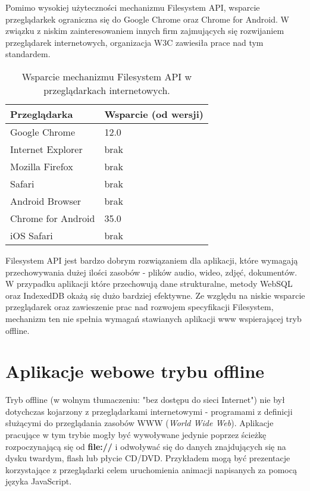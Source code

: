Pomimo wysokiej użyteczności mechanizmu Filesystem API, wsparcie przeglądarkek ograniczna się do Google Chrome oraz Chrome for Android. W związku z niskim zainteresowaniem innych firm zajmujących się rozwijaniem przeglądarek internetowych, organizacja W3C zawiesiła prace nad tym standardem.

\begin{table}[h]
\centering
    \begin{tabular}{ | p{8cm} | p{6cm} | }
    \hline
    \textbf{Przeglądarka} & \textbf{Wsparcie (od wersji)} \\ \hline
	Google Chrome & 12.0
	\\ \hline
	Internet Explorer & brak
	\\ \hline
	Mozilla Firefox & brak
	\\ \hline
	Safari & brak
	\\ \hline
	Android Browser & brak
	\\ \hline
	Chrome for Android & 35.0
	\\ \hline
	iOS Safari & brak
	\\ \hline
    \end{tabular}
	\caption{Wsparcie mechanizmu Filesystem API w przeglądarkach internetowych.}
\end{table}

Filesystem API jest bardzo dobrym rozwiązaniem dla aplikacji, które wymagają przechowywania dużej ilości zasobów - plików audio, wideo, zdjęć, dokumentów. W przypadku aplikacji które przechowują dane strukturalne, metody WebSQL oraz IndexedDB okażą się dużo bardziej efektywne. Ze względu na niskie wsparcie przeglądarek oraz zawieszenie prac nad rozwojem specyfikacji Filesystem, mechanizm ten nie spełnia wymagań stawianych aplikacji www wspierającej tryb offline.

\section{Aplikacje webowe trybu offline}
\label{sec:appWebOff}

Tryb offline (w wolnym tłumaczeniu: "bez dostępu do sieci Internet") nie był dotychczas kojarzony z przeglądarkami internetowymi - programami z definicji służącymi do przeglądania zasobów WWW (\emph{World Wide Web}). Aplikacje pracujące w tym trybie mogły być wywoływane jedynie poprzez ścieżkę rozpoczynającą się od \textbf{file://} i odwoływać się do danych znajdujących się na dysku twardym, flash lub płycie CD/DVD. Przykładem mogą być prezentacje korzystające z przeglądarki celem uruchomienia animacji napisanych za pomocą języka JavaScript.


